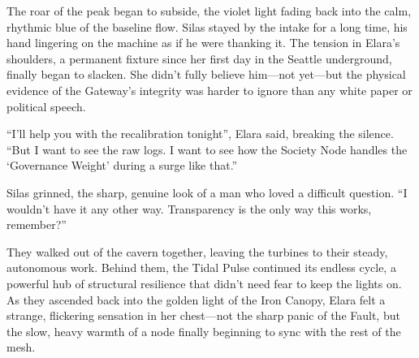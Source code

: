 The roar of the peak began to subside, the violet light fading back into the calm, rhythmic blue of the baseline flow. Silas stayed by the intake for a long time, his hand lingering on the machine as if he were thanking it. The tension in Elara's shoulders, a permanent fixture since her first day in the Seattle underground, finally began to slacken. She didn't fully believe him—not yet—but the physical evidence of the Gateway's integrity was harder to ignore than any white paper or political speech.

``I'll help you with the recalibration tonight'', Elara said, breaking the silence. ``But I want to see the raw logs. I want to see how the Society Node handles the `Governance Weight' during a surge like that.''

Silas grinned, the sharp, genuine look of a man who loved a difficult question. ``I wouldn't have it any other way. Transparency is the only way this works, remember?''

They walked out of the cavern together, leaving the turbines to their steady, autonomous work. Behind them, the Tidal Pulse continued its endless cycle, a powerful hub of structural resilience that didn't need fear to keep the lights on. As they ascended back into the golden light of the Iron Canopy, Elara felt a strange, flickering sensation in her chest—not the sharp panic of the Fault, but the slow, heavy warmth of a node finally beginning to sync with the rest of the mesh.
